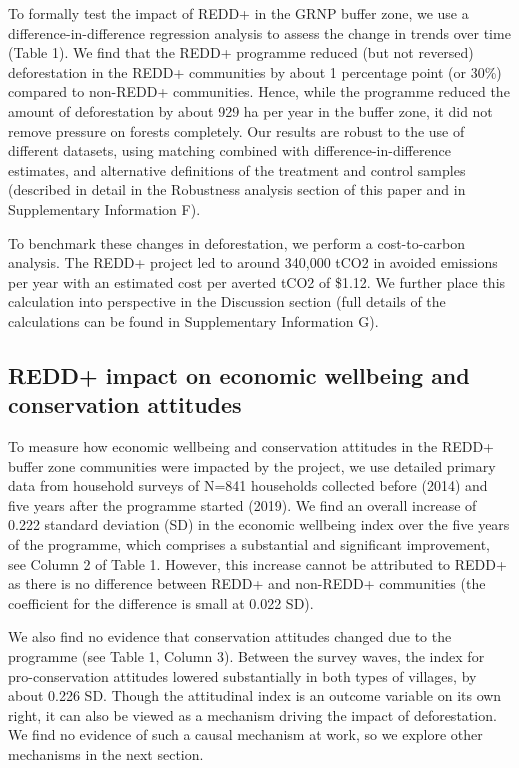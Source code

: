 \documentclass[
]{article}
\begin{document}
To formally test the impact of REDD+ in the GRNP buffer zone, we use a
difference-in-difference regression analysis to assess the change in
trends over time (Table 1). We find that the REDD+ programme reduced
(but not reversed) deforestation in the REDD+ communities by about 1
percentage point (or 30\%) compared to non-REDD+ communities. Hence,
while the programme reduced the amount of deforestation by about 929 ha
per year in the buffer zone, it did not remove pressure on forests
completely. Our results are robust to the use of different datasets,
using matching combined with difference-in-difference estimates, and
alternative definitions of the treatment and control samples (described
in detail in the Robustness analysis section of this paper and in
Supplementary Information F).

To benchmark these changes in deforestation, we perform a cost-to-carbon
analysis. The REDD+ project led to around 340,000 tCO2 in avoided
emissions per year with an estimated cost per averted tCO2 of \$1.12. We
further place this calculation into perspective in the Discussion
section (full details of the calculations can be found in Supplementary
Information G).

\hypertarget{redd-impact-on-economic-wellbeing-and-conservation-attitudes}{%
\subsection{REDD+ impact on economic wellbeing and conservation
attitudes}\label{redd-impact-on-economic-wellbeing-and-conservation-attitudes}}

To measure how economic wellbeing and conservation attitudes in the
REDD+ buffer zone communities were impacted by the project, we use
detailed primary data from household surveys of N=841 households
collected before (2014) and five years after the programme started
(2019). We find an overall increase of 0.222 standard deviation (SD) in
the economic wellbeing index over the five years of the programme, which
comprises a substantial and significant improvement, see Column 2 of
Table 1. However, this increase cannot be attributed to REDD+ as there
is no difference between REDD+ and non-REDD+ communities (the
coefficient for the difference is small at 0.022 SD).

We also find no evidence that conservation attitudes changed due to the
programme (see Table 1, Column 3). Between the survey waves, the index
for pro-conservation attitudes lowered substantially in both types of
villages, by about 0.226 SD. Though the attitudinal index is an outcome
variable on its own right, it can also be viewed as a mechanism driving
the impact of deforestation. We find no evidence of such a causal
mechanism at work, so we explore other mechanisms in the next section.
\end{document}
